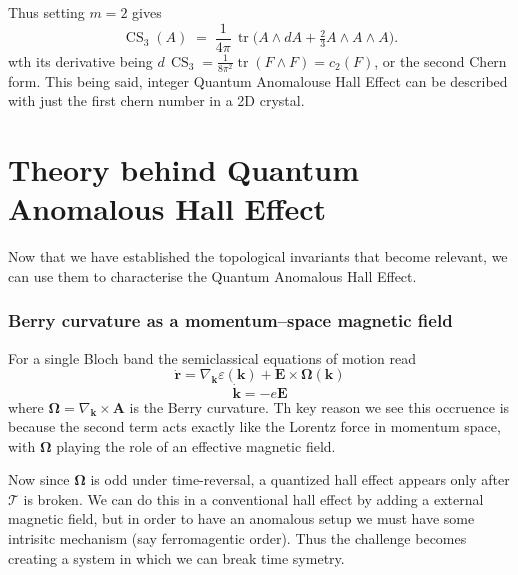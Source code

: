 \documentclass[aps,prb,twocolumn]{revtex4-2}
\begin{document}
      Thus setting $m=2$ gives
      \begin{equation}
        \operatorname{CS}_{3}(A) \;=\;\frac{1}{4\pi}\,\operatorname{tr} \bigl(A\wedge dA + \tfrac23 A\wedge A\wedge A\bigr). \label{eq:CS3}
      \end{equation}
      wth its derivative being 
      \(d\,\operatorname{CS}_{3}=\tfrac{1}{8\pi^{2}}\operatorname{tr}(F\wedge F)
       = c_{2}(F)\),
      or the second Chern form. This being said, integer Quantum Anomalouse Hall Effect can be described with just the first chern number in a 2D crystal.

  \section{Theory behind Quantum Anomalous Hall Effect}

      Now that we have established the topological invariants that become relevant, we can use them to characterise the Quantum Anomalous Hall Effect.       
      \subsubsection{Berry curvature as a momentum--space magnetic field}
      For a single Bloch band the semiclassical equations of motion read            
      \begin{equation}
        \dot{\mathbf r} = \nabla_{\mathbf k} \varepsilon(\mathbf k)+\mathbf E \times \bm{\Omega}(\mathbf k)
      \end{equation}
      \begin{equation}
        \dot{\mathbf k} = -e\mathbf E
      \end{equation}
      where $\bm{\Omega}=\nabla_{\mathbf k}\times \mathbf A$ is the Berry curvature. Th key reason we see this occruence is because the second term acts exactly like the Lorentz force in momentum space, with $\bm{\Omega}$ playing the role of an effective magnetic field.

      Now since $\bm\Omega$ is odd under time-reversal, a quantized hall effect appears only after $\mathcal{T}$ is broken. We can do this in a conventional hall effect by adding a external magnetic field, but in order to have an anomalous setup we must have some intrisitc mechanism (say ferromagentic order). Thus the challenge becomes creating a system in which we can break time symetry.
\end{document}
